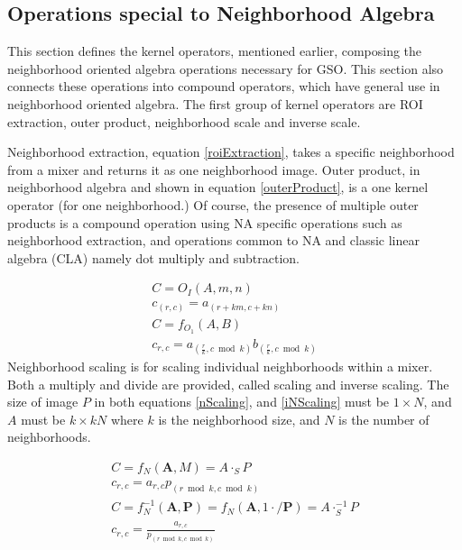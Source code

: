 \documentclass[11pt]{article}
\begin{document}
\subsection{Operations special to Neighborhood Algebra}
This section defines the kernel operators, mentioned earlier, composing the neighborhood oriented algebra operations necessary for GSO.  This section also connects these operations into compound operators, which have general use in neighborhood oriented algebra.  
The first group of kernel operators are ROI extraction, outer product, neighborhood scale and inverse scale.

Neighborhood extraction, equation \ref{roiExtraction}, takes a specific neighborhood from a mixer and returns it as one neighborhood image.  Outer product, in neighborhood algebra and shown in equation \ref{outerProduct}, is a one kernel operator (for one neighborhood.)  Of course, the presence of multiple outer products is a compound operation using NA specific operations such as neighborhood extraction, and operations common to NA and classic linear algebra (CLA) namely dot multiply and subtraction.  


\begin{eqnarray}
		C = O_I(A,m,n) \\
		c_{(r,c)} = a_{(r+km, c+kn)} \label{roiExtraction}\\
		C = f_{O_1}(A,B) \\
		c_{r, c}  = a_{(\frac{r}{k}, c \bmod k)}  b_{(\frac{r}{k}, c \bmod k)} \label{outerProduct}
\end{eqnarray}
Neighborhood scaling is for scaling individual neighborhoods within a mixer.  Both a multiply and divide are provided, called scaling and inverse scaling.  The size of image $P$ in both equations \ref{nScaling}, and \ref{iNScaling} must be $1 \times N$, and $A$ must be $k \times kN$ where $k$ is the neighborhood size, and $N$ is the number of neighborhoods.  

\begin{eqnarray}
		C = f_N(\mathbf{A},M) = A \cdot_S P \\
		c_{r,c} = {a_{r, c}} {p_{(r \bmod {k}, c \bmod {k})}} \label{nScaling}\\
		C = f_N^{-1}(\mathbf{A},\mathbf{P}) = f_N (\mathbf{A}, 1\cdot/\mathbf{P}) = A \cdot_S^{-1} P \\
		c_{r,c} = \frac{a_{r, c}} {p_{(r \bmod k, c \bmod k)}} \label{iNScaling}
\end{eqnarray}
\end{document}
